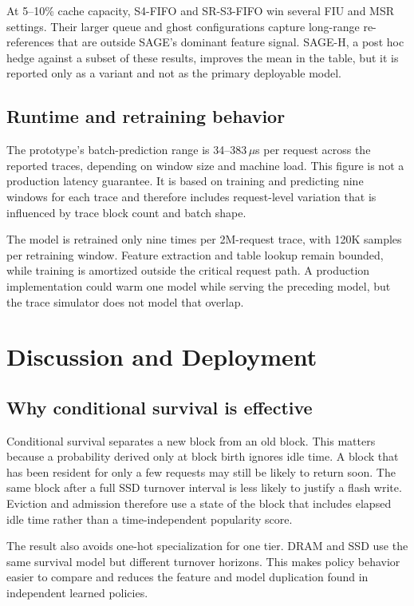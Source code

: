 \documentclass[conference]{IEEEtran}
\newcommand{\us}{\ensuremath{\mu}s}
\begin{document}
\begin{table}[t]
At 5--10\% cache capacity, S4-FIFO and SR-S3-FIFO win several FIU and MSR settings. Their larger queue and ghost configurations capture long-range re-references that are outside SAGE's dominant feature signal. SAGE-H, a post hoc hedge against a subset of these results, improves the mean in the table, but it is reported only as a variant and not as the primary deployable model.

\subsection{Runtime and retraining behavior}
The prototype's batch-prediction range is 34--383\,\us{} per request across the reported traces, depending on window size and machine load. This figure is not a production latency guarantee. It is based on training and predicting nine windows for each trace and therefore includes request-level variation that is influenced by trace block count and batch shape.

The model is retrained only nine times per 2M-request trace, with 120K samples per retraining window. Feature extraction and table lookup remain bounded, while training is amortized outside the critical request path. A production implementation could warm one model while serving the preceding model, but the trace simulator does not model that overlap.

\section{Discussion and Deployment}
\subsection{Why conditional survival is effective}
Conditional survival separates a new block from an old block. This matters because a probability derived only at block birth ignores idle time. A block that has been resident for only a few requests may still be likely to return soon. The same block after a full SSD turnover interval is less likely to justify a flash write. Eviction and admission therefore use a state of the block that includes elapsed idle time rather than a time-independent popularity score.

The result also avoids one-hot specialization for one tier. DRAM and SSD use the same survival model but different turnover horizons. This makes policy behavior easier to compare and reduces the feature and model duplication found in independent learned policies.


\end{table}
\end{document}
